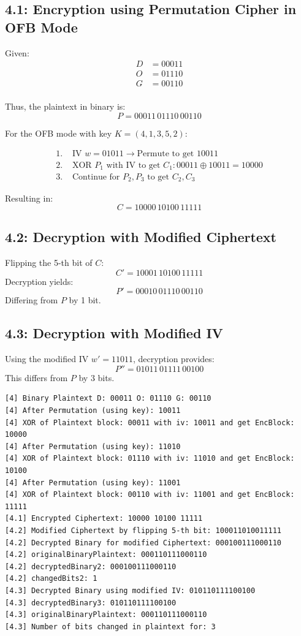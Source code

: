 \documentclass{article}
\begin{document}
\subsection*{4.1: Encryption using Permutation Cipher in OFB Mode}

Given:
\begin{align*}
  D &= 00011 \\
  O &= 01110 \\
  G &= 00110 \\
\end{align*}

Thus, the plaintext in binary is:
\[
  P = 00011\,01110\,00110
\]

For the OFB mode with key \( K = (4,1,3,5,2) \):

\begin{align*}
  1. &\text{ IV } w = 01011 \rightarrow \text{Permute to get } 10011 \\
  2. &\text{ XOR } P_1 \text{ with IV to get } C_1: 00011 \oplus 10011 = 10000 \\
  3. &\text{ Continue for } P_2, P_3 \text{ to get } C_2, C_3
\end{align*}

Resulting in:
\[
  C = 10000\,10100\,11111
\]

\subsection*{4.2: Decryption with Modified Ciphertext}

Flipping the 5-th bit of \( C \):
\[
  C' = 10001\,10100\,11111
\]
Decryption yields:
\[
  P' = 00010\,01110\,00110
\]
Differing from \( P \) by 1 bit.

\subsection*{4.3: Decryption with Modified IV}

Using the modified IV \( w' = 11011 \), decryption provides:
\[
  P'' = 01011\,01111\,00100
\]
This differs from \( P \) by 3 bits.\\

\begin{verbatim}
[4] Binary Plaintext D: 00011 O: 01110 G: 00110
[4] After Permutation (using key): 10011
[4] XOR of Plaintext block: 00011 with iv: 10011 and get EncBlock: 10000
[4] After Permutation (using key): 11010
[4] XOR of Plaintext block: 01110 with iv: 11010 and get EncBlock: 10100
[4] After Permutation (using key): 11001
[4] XOR of Plaintext block: 00110 with iv: 11001 and get EncBlock: 11111
[4.1] Encrypted Ciphertext: 10000 10100 11111
[4.2] Modified Ciphertext by flipping 5-th bit: 100011010011111
[4.2] Decrypted Binary for modified Ciphertext: 000100111000110
[4.2] originalBinaryPlaintext: 000110111000110
[4.2] decryptedBinary2: 000100111000110
[4.2] changedBits2: 1
[4.3] Decrypted Binary using modified IV: 010110111100100
[4.3] decryptedBinary3: 010110111100100
[4.3] originalBinaryPlaintext: 000110111000110
[4.3] Number of bits changed in plaintext for: 3
\end{verbatim}
\end{document}
